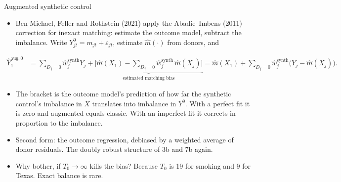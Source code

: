 \documentclass[
  11pt,
  ignorenonframetext,
  aspectratio=169,
]{beamer}
\providecommand{\tightlist}{%
  \setlength{\itemsep}{0pt}\setlength{\parskip}{0pt}}
\begin{document}
\begin{frame}{Augmented synthetic control}
\protect{}\label{augmented-synthetic-control}
\begin{itemize}
\tightlist
\item
  Ben-Michael, Feller and Rothstein (2021) apply the Abadie--Imbens
  (2011) correction for inexact matching: estimate the outcome model,
  subtract the imbalance. Write
  \(Y^0_{jt} = m_{jt} + \varepsilon_{jt}\), estimate \(\hat m(\cdot)\)
  from donors, and
\end{itemize}

\small

\[
\begin{aligned}
\hat Y^{\text{aug},0}_{1} &= \textstyle\sum_{D_j = 0} \hat w_j^{\text{synth}} Y_j + \underbrace{\big[ \hat m(X_1) - \sum_{D_j = 0} \hat w_j^{\text{synth}}\, \hat m(X_j) \big]}_{\text{estimated matching bias}}
= \hat m(X_1) + \sum_{D_j = 0} \hat w_j^{\text{synth}} \big( Y_j - \hat m(X_j) \big).
\end{aligned}
\] \normalsize

\begin{itemize}
\tightlist
\item
  The bracket is the outcome model's prediction of how far the synthetic
  control's imbalance in \(X\) translates into imbalance in \(Y^0\).
  With a perfect fit it is zero and augmented equals classic. With an
  imperfect fit it corrects in proportion to the imbalance.
\item
  Second form: the outcome regression, debiased by a weighted average of
  donor residuals. The doubly robust structure of 3b and 7b again.
\item
  Why bother, if \(T_0 \to \infty\) kills the bias? Because \(T_0\) is
  19 for smoking and 9 for Texas. Exact balance is rare.
\end{itemize}
\end{frame}
\end{document}
